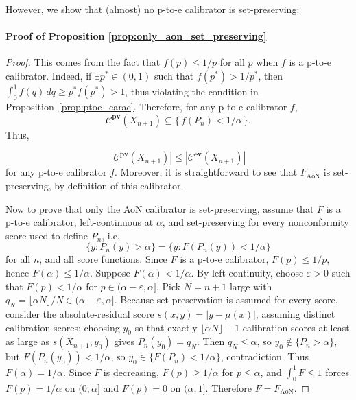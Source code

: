 \documentclass{article}
\theoremstyle{plain}
\theoremstyle{definition}
\theoremstyle{remark}
\begin{document}




However, we show that (almost) no p-to-e calibrator is set-preserving:

\paragraph{Proof of Proposition \ref{prop:only_aon_set_preserving}}


\begin{proof}
    
This comes from the fact that  \( f(p) \le 1/p \) for all \( p \) when \( f \) is a p-to-e calibrator. Indeed, if $\exists p^*\in(0,1)$ such that $f(p^*)>1/p^*$, then \(\int_0^1 f(q)\,dq \ge p^* f(p^*) > 1\), thus violating the condition in Proposition~\ref{prop:ptoe_carac}. Therefore, for any  p-to-e calibrator $f$,
$$\mathcal{C}^{\textbf{pv}}(X_{n+1}) \subseteq \{\, f(P_n) < 1/\alpha \,\}.$$
  Thus,

  $$|\mathcal{C}^{\textbf{pv}}(X_{n+1})|\le |\mathcal{C}^{\textbf{ev}}(X_{n+1})| $$
for any p-to-e calibrator $f$. 
Moreover, it is straightforward to see that $F_{\text{AoN}}$ is set-preserving, by definition of this calibrator. 



Now to prove that only the AoN calibrator is set-preserving, assume that \(F\) is a p-to-e calibrator, left-continuous at \(\alpha\), and set-preserving for every nonconformity score used to define \(P_n\), i.e.
\[
\{y:P_n(y)>\alpha\}=\{y:F(P_n(y))<1/\alpha\}
\]
for all \(n\), and all score functions. Since \(F\) is a p-to-e calibrator, \(F(p)\le 1/p\), hence \(F(\alpha)\le 1/\alpha\). Suppose \(F(\alpha)<1/\alpha\). By left-continuity, choose \(\varepsilon>0\) such that \(F(p)<1/\alpha\) for \(p\in(\alpha-\varepsilon,\alpha]\). Pick \(N=n+1\) large with \(q_N=\lfloor \alpha N\rfloor/N\in(\alpha-\varepsilon,\alpha]\). Because set-preservation is assumed for every score, consider the absolute-residual score \(s(x,y)=|y-\mu(x)|\), assuming distinct calibration scores; choosing \(y_0\) so that exactly \(\lfloor\alpha N\rfloor-1\) calibration scores at least as large as \(s(X_{n+1},y_0)\) gives \(P_n(y_0)=q_N\). Then \(q_N\le\alpha\), so \(y_0\notin\{P_n>\alpha\}\), but \(F(P_n(y_0))<1/\alpha\), so \(y_0\in\{F(P_n)<1/\alpha\}\), contradiction. Thus \(F(\alpha)=1/\alpha\). Since \(F\) is decreasing, \(F(p)\ge1/\alpha\) for \(p\le\alpha\), and \(\int_0^1F\le1\) forces \(F(p)=1/\alpha\) on \((0,\alpha]\) and \(F(p)=0\) on \((\alpha,1]\). Therefore \(F=F_{\mathrm{AoN}}\).

\end{proof}
\end{document}
